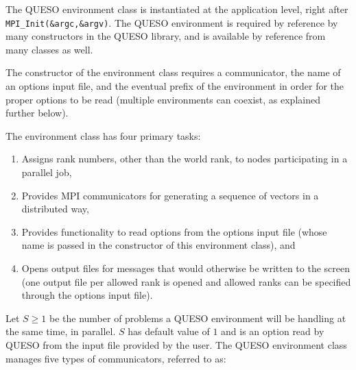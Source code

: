 The QUESO environment class is instantiated at the application level, right after \linebreak\verb+MPI_Init(&argc,&argv)+. 
The QUESO environment is required by reference by many constructors in the QUESO library, and is available by reference from many classes as well.

The constructor of the environment class requires a communicator, the name of an options input file,
and the eventual prefix of the environment in order for the proper options to be read (multiple environments can coexist, as explained further below).

The environment class has four primary tasks:
\begin{enumerate}
\item Assigns rank numbers, other than the world rank, to nodes participating in a parallel job,
\item Provides MPI communicators for generating a sequence of vectors in a distributed way,
\item Provides functionality to read options from the options input file (whose name is passed in the constructor of this environment class), and
\item Opens output files for messages that would otherwise be written to the screen (one output file per allowed rank is opened and allowed ranks can be specified through the options input file).
\end{enumerate}




Let $S \geqslant 1$ be the number of problems a QUESO environment will be handling at the same time, in parallel.
$S$ has default value of $1$ and is an option read by QUESO from the input file provided by the user.
The QUESO environment class manages five types of communicators, referred to as:

